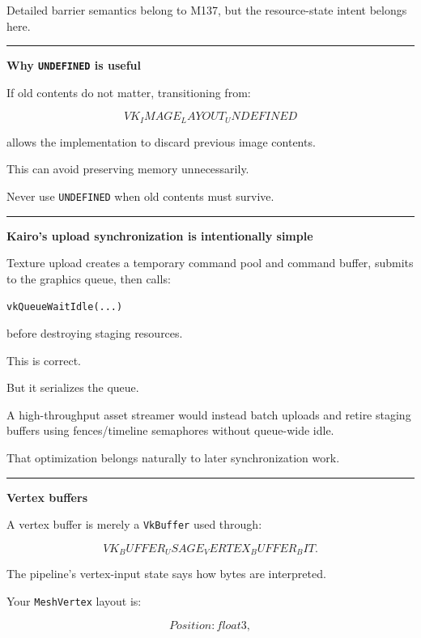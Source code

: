 Detailed barrier semantics belong to M137, but the resource-state intent belongs here.

\begin{center}\rule{0.5\linewidth}{0.5pt}\end{center}

\textbf{Why \texttt{UNDEFINED} is useful}

If old contents do not matter, transitioning from:

\[
VK_IMAGE_LAYOUT_UNDEFINED
\]

allows the implementation to discard previous image contents.

This can avoid preserving memory unnecessarily.

Never use \texttt{UNDEFINED} when old contents must survive.

\begin{center}\rule{0.5\linewidth}{0.5pt}\end{center}

\textbf{Kairo's upload synchronization is intentionally simple}

Texture upload creates a temporary command pool and command buffer, submits to the graphics queue, then calls:

\begin{verbatim}
vkQueueWaitIdle(...)
\end{verbatim}

before destroying staging resources.

This is correct.

But it serializes the queue.

A high-throughput asset streamer would instead batch uploads and retire staging buffers using fences/timeline semaphores without queue-wide idle.

That optimization belongs naturally to later synchronization work.

\begin{center}\rule{0.5\linewidth}{0.5pt}\end{center}

\textbf{Vertex buffers}

A vertex buffer is merely a \texttt{VkBuffer} used through:

\[
VK_BUFFER_USAGE_VERTEX_BUFFER_BIT.
\]

The pipeline's vertex-input state says how bytes are interpreted.

Your \texttt{MeshVertex} layout is:

\[
Position:float3,
\]

